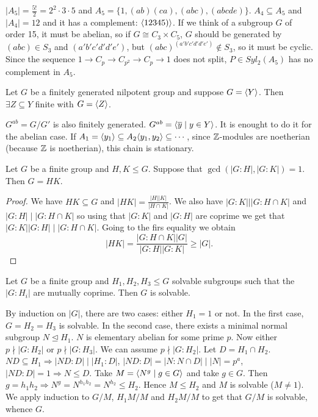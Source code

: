 \documentclass[twoside, 11pt]{article}
\begin{document}
\begin{ej}
$|A_5|=\frac{5!}{2}=2^2\cdot 3\cdot 5$ and $A_5=\{1,(ab)(ca), (abc), (abcde)\}$. $A_4\subseteq A_5$ and $|A_4|=12$ and it has a complement: $\langle{12345)}\rangle$. If we think of a subgroup $G$ of order 15, it must be abelian, so if $G\cong C_3\times C_5$, $G$ should be generated by $(abc)\in S_3$ and $(a'b'c'd'd'e')$, but $(abc)^{(a'b'c'd'd'e')}\notin S_3$, so it must be cyclic. Since the sequence $1\to C_p\to C_{p^2}\to C_p\to 1$ does not split, $P\in Syl_2(A_5)$ has no complement in $A_5$. 
\end{ej}

\begin{prop}
Let $G$ be a finitely generated nilpotent group and suppose $G=\langle{Y}\rangle$. Then $\exists Z\subseteq Y$ finite with $G=\langle{Z}\rangle$.
\end{prop}
\begin{dem}
 $G^{ab}=G/G'$ is also finitely generated. $G^{ab}=\langle{\overline{y}\mid y\in Y}\rangle$. It is enought to do it for the abelian case. If $A_1=\langle{y_1}\rangle\subseteq A_2\langle{y_1,y_2}\rangle\subseteq\cdots$, since $\mathbb{Z}$-modules are noetherian (because $\mathbb{Z}$ is noetherian), this chain is stationary.
\end{dem}



\begin{lemma}
Let $G$ be a finite group and $H,K\leq G$. Suppose that $\gcd(|G:H|,|G:K|)=1$. Then $G=HK$. 
\end{lemma}
\begin{proof}
We have $HK\subseteq G$ and $|HK|=\frac{|H||K|}{|H\cap K|}$. We also have $|G:K|||G:H\cap K|$ and $|G:H|\mid|G:H\cap K|$ so using that $|G:K|$ and $|G:H|$ are coprime we get that $|G:K||G:H| \mid|G:H\cap K|$. Going to the firs equality we obtain 
\[
|HK|=\frac{|G:H\cap K||G|}{|G:H||G:K|}\geq |G|.
\]
\end{proof}

\begin{teorema}
Let $G$ be a finite group and $H_1,H_2,H_3\leq G$ solvable subgroups such that the $|G:H_i|$ are mutually coprime. Then $G$ is solvable.
\end{teorema}
\begin{dem}
By induction on $|G|$, there are two cases: either $H_1=1$ or not. In the first case, $G=H_2=H_3$ is solvable. In the second case, there exists a minimal normal subgroup $N\trianglelefteq H_1$. $N$ is elementary abelian for some prime $p$. Now either $p\nmid |G:H_2|$ or $p\nmid|G:H_3|$. We can assume $p\nmid|G:H_2|$. Let $D=H_1\cap H_2$. $ND\subseteq H_1\Rightarrow |ND:D|\mid|H_1:D|$, $|ND:D|=|N:N\cap D|\mid|N|=p^a$, $|ND:D|=1\Rightarrow N\leq D$. Take $M=\langle{N^g\mid g\in G}\rangle$ and take $g\in G$. Then $g=h_1h_2\Rightarrow N^g=N^{h_1h_2}=N^{h_2}\leq H_2$. Hence $M\leq H_2$ and $M$ is solvable ($M\neq 1$). We apply induction to $G/M$, $H_1M/M$ and $H_2M/M$ to get that $G/M$ is solvable, whence $G$.
\end{dem}
\end{document}
